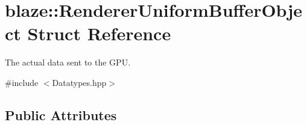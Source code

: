 \hypertarget{structblaze_1_1RendererUniformBufferObject}{}\section{blaze\+:\+:Renderer\+Uniform\+Buffer\+Object Struct Reference}
\label{structblaze_1_1RendererUniformBufferObject}


The actual data sent to the G\+PU.  




{\ttfamily \#include $<$Datatypes.\+hpp$>$}

\subsection*{Public Attributes}
